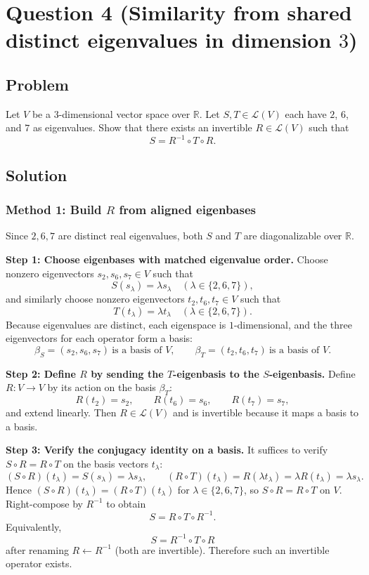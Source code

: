 \documentclass[12pt]{article}
\newcommand{\R}{\mathbb{R}}
\newcommand{\cL}{\mathcal{L}}
\begin{document}
\newpage
\section{Question 4 (Similarity from shared distinct eigenvalues in dimension $3$)}
\subsection{Problem}
Let $V$ be a $3$-dimensional vector space over $\R$.
Let $S,T\in\cL(V)$ each have $2$, $6$, and $7$ as eigenvalues.
Show that there exists an invertible $R\in\cL(V)$ such that
\[
S=R^{-1}\circ T\circ R.
\]

\subsection{Solution}

\subsubsection{Method 1: Build $R$ from aligned eigenbases}
Since $2,6,7$ are distinct real eigenvalues, both $S$ and $T$ are diagonalizable over $\R$.

\medskip
\noindent\textbf{Step 1: Choose eigenbases with matched eigenvalue order.}
Choose nonzero eigenvectors $s_2,s_6,s_7\in V$ such that
\[
S(s_\lambda)=\lambda s_\lambda\quad (\lambda\in\{2,6,7\}),
\]
and similarly choose nonzero eigenvectors $t_2,t_6,t_7\in V$ such that
\[
T(t_\lambda)=\lambda t_\lambda\quad (\lambda\in\{2,6,7\}).
\]
Because eigenvalues are distinct, each eigenspace is $1$-dimensional, and the three eigenvectors for each operator form a basis:
\[
\beta_S=(s_2,s_6,s_7)\ \text{is a basis of }V,\qquad
\beta_T=(t_2,t_6,t_7)\ \text{is a basis of }V.
\]

\medskip
\noindent\textbf{Step 2: Define $R$ by sending the $T$-eigenbasis to the $S$-eigenbasis.}
Define $R:V\to V$ by its action on the basis $\beta_T$:
\[
R(t_2)=s_2,\qquad R(t_6)=s_6,\qquad R(t_7)=s_7,
\]
and extend linearly. Then $R\in\cL(V)$ and is invertible because it maps a basis to a basis.

\medskip
\noindent\textbf{Step 3: Verify the conjugacy identity on a basis.}
It suffices to verify $S\circ R=R\circ T$ on the basis vectors $t_\lambda$:
\[
(S\circ R)(t_\lambda)=S(s_\lambda)=\lambda s_\lambda,\qquad
(R\circ T)(t_\lambda)=R(\lambda t_\lambda)=\lambda R(t_\lambda)=\lambda s_\lambda.
\]
Hence $(S\circ R)(t_\lambda)=(R\circ T)(t_\lambda)$ for $\lambda\in\{2,6,7\}$, so $S\circ R=R\circ T$ on $V$.
Right-compose by $R^{-1}$ to obtain
\[
S=R\circ T\circ R^{-1}.
\]
Equivalently,
\[
S=R^{-1}\circ T\circ R
\]
after renaming $R\leftarrow R^{-1}$ (both are invertible). Therefore such an invertible operator exists.
\end{document}
